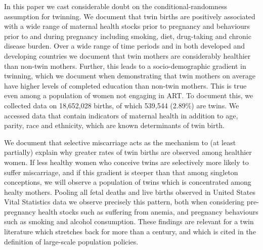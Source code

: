 \documentclass[11pt]{article}
\begin{document}
In this paper we cast considerable doubt on the conditional-randomness assumption for twinning.  We document that twin births are positively associated with a wide range of maternal health stocks prior to pregnancy and behaviours prior to and during pregnancy including smoking, diet, drug-taking and chronic disease burden.  Over a wide range of time periods and in both developed and developing countries we document that twin mothers are considerably healthier than non-twin mothers. Further, this leads to a socio-demographic gradient in twinning, which we document when demonstrating that twin mothers on average have higher levels of completed education than non-twin mothers. This is true even among a population of women not engaging in ART.  To document this, we collected data on 18,652,028 births, of which 539,544 (2.89\%) are twins. We accessed data that contain indicators of maternal health in addition to age, parity, race and ethnicity, which are known determinants of twin birth\cite{Bulmer1970}.

We document that selective miscarriage acts as the mechanism to (at least partially) explain why greater rates of twin births are observed among healthier women.  If less healthy women who conceive twins are selectively more likely to suffer miscarriage, and if this gradient is steeper than that among singleton conceptions, we will observe a population of twins which is concentrated among healty mothers.
Pooling all fetal deaths and live births observed in United States Vital Statistics data we observe precisely this pattern, both when considering pre-pregnancy health stocks such as suffering from anemia, and pregnancy behaviours such as smoking and alcohol consumption.  These findings are relevant for a twin literature which stretches back for more than a century\cite{Thorndike1905}, and which is cited in the definition of large-scale population policies.
\end{document}
